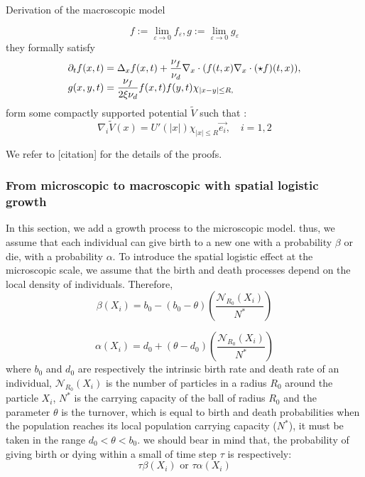 \begin{paragraph}{Derivation of the macroscopic model}
\begin{prop}
$$ f := \lim_{\varepsilon \rightarrow 0} f_{\varepsilon}, g := \lim_{\varepsilon \rightarrow 0} g_{\varepsilon} $$
they formally satisfy 
\begin{equation}
	\begin{array}{l}
	\p_t f(x,t)  = \Delta_x f(x,t) + \dfrac{\nu_f}{\nu_d} \nabla_x \cdot (f(t,x) \nabla_x \cdot (\title{V} \star f)(t,x)),\\
	g(x,y,t) = \dfrac{\nu_f}{2 \xi \nu_d}  f(x,t)f(y,t) \chi_{\vert x- y \vert \leq R,}
	\end{array}
	\end{equation}
form some compactly supported potential $\tilde{V}$ such that : 
$$ \nabla_i \tilde{V}(x) = U' (\vert x \vert) \chi_{\vert x \vert \leq R} \vec{e_i}, \quad i=1, 2 $$
\end{prop}
We refer to [citation] for the details of the proofs.
\end{paragraph}

\subsubsection{From microscopic to macroscopic with spatial logistic growth}
In this section, we add a growth process to the microscopic model. thus, we assume that each individual can give birth to a new one with a probability $\beta$ or die, with a probability $\alpha$. To introduce the spatial logistic effect at the microscopic scale, we assume that the birth and death processes depend on the local density of individuals. Therefore, 
\begin{equation}
\beta(X_i) = b_0 -(b_0 - \theta)\left(\frac{\mathcal{N}_{R_0}(X_i)}{N^{*}}\right)
\end{equation}

\begin{equation}
\alpha(X_i) = d_0 + (\theta - d_0) \left(\frac{\mathcal{N}_{R_0}(X_i)}{N^{*}}\right)
\end{equation}
where $b_0$ and $d_0$ are respectively the intrinsic birth rate and death rate of an individual, $\mathcal{N}_{R_0}(X_i)$ is the number of particles in a radius $R_0$ around the particle $X_i$, $N^{*}$ is the carrying capacity of the ball of radius $R_0$ and the parameter $\theta$ is the turnover, which is equal to birth and death probabilities when the population reaches its local population carrying capacity ($N^{*}$), it must be taken in the range $d_{0}<\theta<b_{0}$. 
we should bear in mind that, the probability of giving birth or dying within a small of time step  $\tau$ is respectively:
\begin{equation}
\tau \beta(X_i)  \text{ or } \tau \alpha(X_i)
\end{equation}

